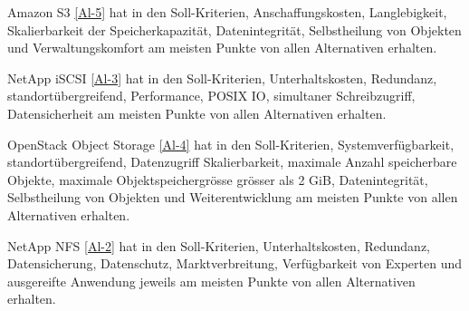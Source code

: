 Amazon S3 \ref{Al-5} hat in den Soll-Kriterien, Anschaffungskosten, Langlebigkeit, Skalierbarkeit der Speicherkapazität, Datenintegrität, Selbstheilung von Objekten und Verwaltungskomfort am meisten Punkte von allen Alternativen erhalten.

NetApp iSCSI \ref{Al-3} hat in den Soll-Kriterien, Unterhaltskosten, Redundanz, standortübergreifend, Performance, POSIX IO, simultaner Schreibzugriff, Datensicherheit am meisten Punkte von allen Alternativen erhalten.

OpenStack Object Storage \ref{Al-4} hat in den Soll-Kriterien, Systemverfügbarkeit, standortübergreifend, Datenzugriff Skalierbarkeit, maximale Anzahl speicherbare Objekte, maximale Objektspeichergrösse grösser als 2 GiB, Datenintegrität, Selbstheilung von Objekten und Weiterentwicklung am meisten Punkte von allen Alternativen erhalten.

NetApp NFS \ref{Al-2} hat in den Soll-Kriterien, Unterhaltskosten, Redundanz, Datensicherung, Datenschutz, Marktverbreitung, Verfügbarkeit von Experten und ausgereifte Anwendung jeweils am meisten Punkte von allen Alternativen erhalten.








